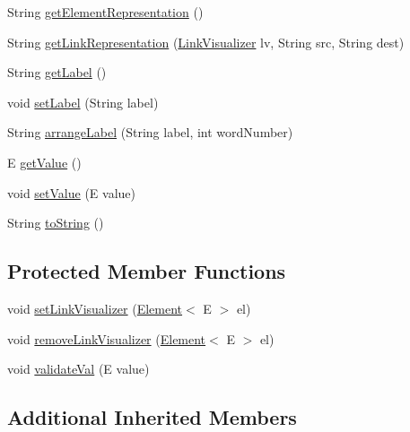 \begin{DoxyCompactItemize}
\item 
String \mbox{\hyperlink{classbridges_1_1base_1_1_element_a8822450cfaf8495bc955d777ad35ea3f}{get\+Element\+Representation}} ()
\item 
String \mbox{\hyperlink{classbridges_1_1base_1_1_element_ae32deb37d1ad95d2fdfaa616062f319d}{get\+Link\+Representation}} (\mbox{\hyperlink{classbridges_1_1base_1_1_link_visualizer}{Link\+Visualizer}} lv, String src, String dest)
\item 
String \mbox{\hyperlink{classbridges_1_1base_1_1_element_a5c831a0238de487765f6021a887f1542}{get\+Label}} ()
\item 
void \mbox{\hyperlink{classbridges_1_1base_1_1_element_a942ccd766aeca0c4fdbe27ef8cbe78d9}{set\+Label}} (String label)
\item 
String \mbox{\hyperlink{classbridges_1_1base_1_1_element_acd2191242df8a7bf2e8b6ced87880ba6}{arrange\+Label}} (String label, int word\+Number)
\item 
E \mbox{\hyperlink{classbridges_1_1base_1_1_element_a44ddc61db34b6cf0bab7dfba667d54af}{get\+Value}} ()
\item 
void \mbox{\hyperlink{classbridges_1_1base_1_1_element_ab3cf1241da0bc4c59cea9d6f0fd7aaf4}{set\+Value}} (E value)
\item 
String \mbox{\hyperlink{classbridges_1_1base_1_1_element_a7dc685e317fd9dc2e73e049a9f907e42}{to\+String}} ()
\end{DoxyCompactItemize}
\subsection*{Protected Member Functions}
\begin{DoxyCompactItemize}
\item 
void \mbox{\hyperlink{classbridges_1_1base_1_1_element_af6251f52b9d277dd77e3bab1829d0197}{set\+Link\+Visualizer}} (\mbox{\hyperlink{classbridges_1_1base_1_1_element}{Element}}$<$ E $>$ el)
\item 
void \mbox{\hyperlink{classbridges_1_1base_1_1_element_a144cd54e043a801fab326769a5da01e2}{remove\+Link\+Visualizer}} (\mbox{\hyperlink{classbridges_1_1base_1_1_element}{Element}}$<$ E $>$ el)
\item 
void \mbox{\hyperlink{classbridges_1_1base_1_1_element_af1a60f4e6a91d379179f7d56e6dc3829}{validate\+Val}} (E value)
\end{DoxyCompactItemize}
\subsection*{Additional Inherited Members}


